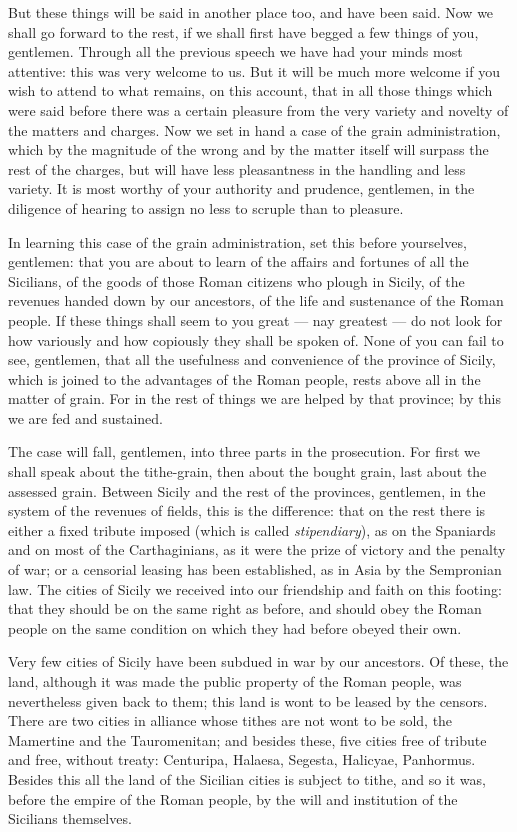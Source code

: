  But these things will be said in another place too, and have been said. Now we shall go forward to the rest, if we shall first have begged a few things of you, gentlemen. Through all the previous speech we have had your minds most attentive: this was very welcome to us. But it will be much more welcome if you wish to attend to what remains, on this account, that in all those things which were said before there was a certain pleasure from the very variety and novelty of the matters and charges. Now we set in hand a case of the grain administration, which by the magnitude of the wrong and by the matter itself will surpass the rest of the charges, but will have less pleasantness in the handling and less variety. It is most worthy of your authority and prudence, gentlemen, in the diligence of hearing to assign no less to scruple than to pleasure.

 In learning this case of the grain administration, set this before yourselves, gentlemen: that you are about to learn of the affairs and fortunes of all the Sicilians, of the goods of those Roman citizens who plough in Sicily, of the revenues handed down by our ancestors, of the life and sustenance of the Roman people. If these things shall seem to you great --- nay greatest --- do not look for how variously and how copiously they shall be spoken of. None of you can fail to see, gentlemen, that all the usefulness and convenience of the province of Sicily, which is joined to the advantages of the Roman people, rests above all in the matter of grain. For in the rest of things we are helped by that province; by this we are fed and sustained.

 The case will fall, gentlemen, into three parts in the prosecution. For first we shall speak about the tithe-grain, then about the bought grain, last about the assessed grain. Between Sicily and the rest of the provinces, gentlemen, in the system of the revenues of fields, this is the difference: that on the rest there is either a fixed tribute imposed (which is called \textit{stipendiary}), as on the Spaniards and on most of the Carthaginians, as it were the prize of victory and the penalty of war; or a censorial leasing has been established, as in Asia by the Sempronian law. The cities of Sicily we received into our friendship and faith on this footing: that they should be on the same right as before, and should obey the Roman people on the same condition on which they had before obeyed their own.

 Very few cities of Sicily have been subdued in war by our ancestors. Of these, the land, although it was made the public property of the Roman people, was nevertheless given back to them; this land is wont to be leased by the censors. There are two cities in alliance whose tithes are not wont to be sold, the Mamertine and the Tauromenitan; and besides these, five cities free of tribute and free, without treaty: Centuripa, Halaesa, Segesta, Halicyae, Panhormus. Besides this all the land of the Sicilian cities is subject to tithe, and so it was, before the empire of the Roman people, by the will and institution of the Sicilians themselves.

